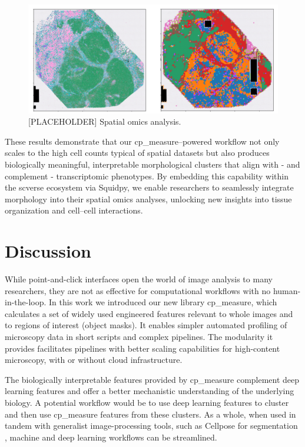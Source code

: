 \documentclass{article}
\begin{document}
\begin{figure}[htbp]
\centering
\includegraphics[width=.99\linewidth]{./figs/fig_4_placeholder.png}
\caption{\label{fig:spatial_omics}{[}PLACEHOLDER] Spatial omics analysis.}
\end{figure}


These results demonstrate that our cp\_measure–powered workflow not only scales to the high cell counts typical of spatial datasets but also produces biologically meaningful, interpretable morphological clusters that align with - and complement - transcriptomic phenotypes. By embedding this capability within the scverse ecosystem via Squidpy, we enable researchers to seamlessly integrate morphology into their spatial omics analyses, unlocking new insights into tissue organization and cell–cell interactions.


\section{Discussion}
\label{sec:orgf37b369}
While point-and-click interfaces open the world of image analysis to many researchers, they are not as effective for computational workflows with no human-in-the-loop. In this work we introduced our new library cp\_measure, which calculates a set of widely used engineered features relevant to whole images and to regions of interest (object masks). It enables simpler automated profiling of microscopy data in short scripts and complex pipelines. The modularity it provides facilitates pipelines with better scaling capabilities for high-content microscopy, with or without cloud infrastructure.

The biologically interpretable features provided by cp\_measure complement deep learning features and offer a better mechanistic understanding of the underlying biology. A potential workflow would be to use deep learning features to cluster and then use cp\_measure features from these clusters. As a whole, when used in tandem with generalist image-processing tools, such as Cellpose for segmentation \cite{stringerCellposeGeneralistAlgorithm2021}, machine and deep learning workflows can be streamlined. 
\end{document}
